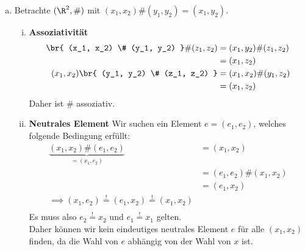 \begin{enumerate}[a)]
  \item Betrachte $ (\R^2, \#) $ mit $ (x_1, x_2)\# (y_1, y_2) = (x_1, y_2) $.
  \begin{enumerate}[i)]
    \item \textbf{Assoziativität}
      \begin{align*}
        \br{ (x_1, x_2) \# (y_1, y_2) } \# (z_1, z_2) &= (x_1, y_2) \# (z_1, z_2) \\
                                                      &= (x_1, z_2) \\
        (x_1, x_2) \br{ (y_1, y_2) \# (z_1, z_2) } &= (x_1, x_2) \# (y_1, z_2) \\
                                                   &= (x_1, z_2) \\
      \end{align*}
      Daher ist $\#$ assoziativ.
    \item \textbf{Neutrales Element}
      Wir suchen ein Element $e = (e_1, e_2)$, welches folgende Bedingung erfüllt:
      \begin{align*}
        \underbrace{(x_1,x_2)\#(e_1, e_2)}_{=(x_1, e_2)} &= (x_1, x_2) \\
                              &= (e_1, e_2) \# (x_1, x_2) \\
                              &= (e_1, x_2) \\
                \implies (x_1, e_2) \overset{!}{=} (e_1, x_2) \overset{!}{=} (x_1, x_2) \\
      \end{align*}
      Es muss also $e_2 \overset{!}{=} x_2$ und $e_1 \overset{!}{=} x_1$ gelten. \\
      Daher können wir kein eindeutiges neutrales Element $e$ für alle $(x_1, x_2)$ finden, da die Wahl von $e$ abhängig von der Wahl von $x$ ist.


\end{enumerate}
\end{enumerate}
